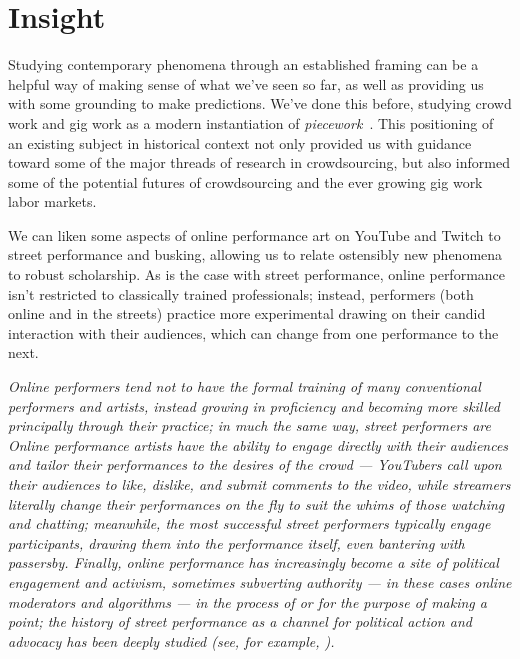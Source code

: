 \documentclass[10pt]{article}
\newcommand{\topic}[1]{{\color{Blue}#1}}
\newenvironment{blah}{\par\color{Gray}\itshape}{\par}
\begin{document}
\section*{Insight}
\topic{Studying contemporary phenomena through an established framing
can be a helpful way of
making sense of what we've seen so far, as well as
providing us with some grounding to make predictions.}
We've done this before, studying crowd work and gig work as
a modern instantiation of \textit{piecework}~\cite{pieceworkCrowdworkGigwork}.
This positioning of an existing subject in historical context not only
provided us with guidance toward some of the major threads of research
in crowdsourcing, but
also informed some of the potential futures of crowdsourcing and
the ever growing gig work labor markets.

\topic{We can liken some aspects of online performance art on YouTube and Twitch
to street performance and busking,
allowing us to relate ostensibly new phenomena to robust scholarship.}
As is the case with street performance,
online performance isn't restricted to classically trained professionals;
instead, performers (both online and in the streets) practice more experimental 
drawing on their candid interaction with their audiences,
which can change from one performance to the next.

\begin{blah}
Online performers
tend not to have the formal training of many conventional performers and artists,
instead growing in proficiency and becoming more skilled principally through their practice;
in much the same way,
street performers are 
%
Online performance artists have the ability
to engage directly with their audiences and tailor their performances to the desires of the crowd
--- YouTubers call upon their audiences to like, dislike, and submit comments to the video, while
    streamers literally change their performances on the fly to suit the whims of those watching and chatting;
meanwhile, the most successful street performers typically engage participants,
drawing them into the performance itself, even bantering with passersby.
%
Finally, online performance has increasingly become a site of political engagement and activism,
sometimes subverting authority
--- in these cases online moderators and algorithms ---
in the process of or for the purpose of making a point;
the history of street performance as a channel for political action and advocacy has been deeply studied
(see, for example, \cite{harrison1990drawing,cohen1998radical}).
\end{blah}
\end{document}
